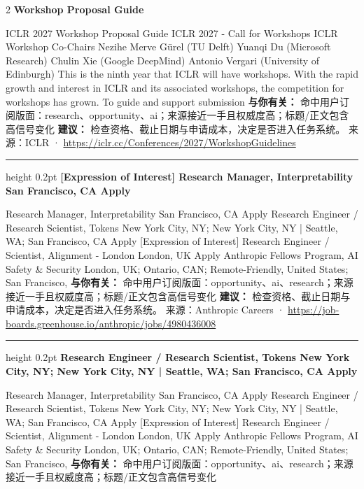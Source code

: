 \documentclass[10.5pt]{ctexart}
\begin{document}
\begin{multicols}{2}
{\large\bfseries Workshop Proposal Guide}\par
ICLR 2027 Workshop Proposal Guide ICLR 2027 - Call for Workshops ICLR Workshop Co-Chairs Nezihe Merve Gürel (TU Delft) Yuanqi Du (Microsoft Research) Chulin Xie (Google DeepMind) Antonio Vergari (University of Edinburgh) This is the ninth year that ICLR will have workshops. With the rapid growth and interest in ICLR and its associated workshops, the competition for workshops has grown. To guide and support submission
\textbf{与你有关：} 命中用户订阅版面：research、opportunity、ai；来源接近一手且权威度高；标题/正文包含高信号变化
\textbf{建议：} 检查资格、截止日期与申请成本，决定是否进入任务系统。
{\footnotesize\color{ormuted} 来源：ICLR · \url{https://iclr.cc/Conferences/2027/WorkshopGuidelines}}
\vspace{2mm}
\hrule height 0.2pt
\vspace{2mm}
{\large\bfseries [Expression of Interest] Research Manager, Interpretability San Francisco, CA Apply}\par
[Expression of Interest] Research Manager, Interpretability San Francisco, CA Apply Research Engineer / Research Scientist, Tokens New York City, NY; New York City, NY | Seattle, WA; San Francisco, CA Apply [Expression of Interest] Research Engineer / Scientist, Alignment - London London, UK Apply Anthropic Fellows Program, AI Safety \& Security London, UK; Ontario, CAN; Remote-Friendly, United States; San Francisco, 
\textbf{与你有关：} 命中用户订阅版面：opportunity、ai、research；来源接近一手且权威度高；标题/正文包含高信号变化
\textbf{建议：} 检查资格、截止日期与申请成本，决定是否进入任务系统。
{\footnotesize\color{ormuted} 来源：Anthropic Careers · \url{https://job-boards.greenhouse.io/anthropic/jobs/4980436008}}
\vspace{2mm}
\hrule height 0.2pt
\vspace{2mm}
{\large\bfseries Research Engineer / Research Scientist, Tokens New York City, NY; New York City, NY | Seattle, WA; San Francisco, CA Apply}\par
[Expression of Interest] Research Manager, Interpretability San Francisco, CA Apply Research Engineer / Research Scientist, Tokens New York City, NY; New York City, NY | Seattle, WA; San Francisco, CA Apply [Expression of Interest] Research Engineer / Scientist, Alignment - London London, UK Apply Anthropic Fellows Program, AI Safety \& Security London, UK; Ontario, CAN; Remote-Friendly, United States; San Francisco, 
\textbf{与你有关：} 命中用户订阅版面：opportunity、ai、research；来源接近一手且权威度高；标题/正文包含高信号变化

\end{multicols}
\end{document}
